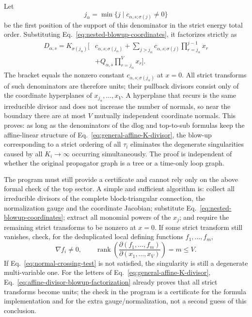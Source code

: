 \documentclass[11pt,a4paper]{article}
\begin{document}
Let
\begin{equation}
 j_\alpha=\min\{j\mid c_{\alpha,s;\sigma(j)}\neq0\}
\end{equation}
be the first position of the support of this denominator in the strict energy total order. Substituting Eq.~\eqref{eq:nested-blowup-coordinates}, it factorizes strictly as
\begin{equation}
 \begin{split}
 D_{\alpha,s}
 =K_{\sigma(j_\alpha)}\Bigg[&c_{\alpha,s;\sigma(j_\alpha)}
 +\sum_{j>j_\alpha}c_{\alpha,s;\sigma(j)}
   \prod_{r=j_\alpha}^{j-1}x_r\\
 &+Q_{\alpha,s}\prod_{r=j_\alpha}^{V}x_r\Bigg].
 \end{split}
 \label{eq:affine-divisor-blowup-factorization}
\end{equation}
The bracket equals the nonzero constant $c_{\alpha,s;\sigma(j_\alpha)}$ at $x=0$. All strict transforms of such denominators are therefore units; their pullback divisors consist only of the coordinate hyperplanes of $x_{j_\alpha},\ldots,x_V$. A hyperplane that recurs is the same irreducible divisor and does not increase the number of normals, so near the boundary there are at most $V$ mutually independent coordinate normals. This proves: as long as the denominators of the dlog and top-to-sub formulas keep the affine-linear structure of Eq.~\eqref{eq:general-affine-K-divisor}, the blow-up corresponding to a strict ordering of all $\tau_i$ eliminates the degenerate singularities caused by all $K_i\to\infty$ occurring simultaneously. The proof is independent of whether the original propagator graph is a tree or a time-only loop graph.

The program must still provide a certificate and cannot rely only on the above formal check of the top sector. A simple and sufficient algorithm is: collect all irreducible divisors of the complete block-triangular connection, the normalization gauge and the coordinate Jacobian; substitute Eq.~\eqref{eq:nested-blowup-coordinates}; extract all monomial powers of the $x_j$; and require the remaining strict transforms to be nonzero at $x=0$. If some strict transform still vanishes, check, for the deduplicated local defining functions $f_1,\ldots,f_m$,
\begin{equation}
 \nabla f_i\neq0,
 \qquad
 \operatorname{rank}\!\left(\frac{\partial(f_1,\ldots,f_m)}
 {\partial(x_1,\ldots,x_V)}\right)=m\leq V.
 \label{eq:normal-crossing-test}
\end{equation}
If Eq.~\eqref{eq:normal-crossing-test} is not satisfied, the singularity is still a degenerate multi-variable one. For the letters of Eq.~\eqref{eq:general-affine-K-divisor}, Eq.~\eqref{eq:affine-divisor-blowup-factorization} already proves that all strict transforms become units; the check in the program is a certificate for the formula implementation and for the extra gauge/normalization, not a second guess of this conclusion.
\end{document}
